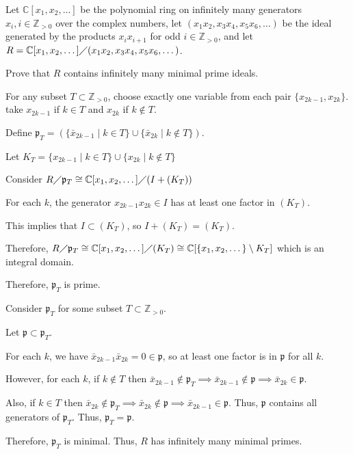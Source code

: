 \documentclass[12pt, letterpaper]{article}
\newcommand{\C}{\mathbb{C}}
\newcommand{\Z}{\mathbb{Z}}
\newcommand{\p}{\mathfrak{p}}
\begin{document}
\begin{problem}{}
    Let $\C[x_1, x_2, \dots]$ be the polynomial ring on infinitely many generators $x_i, i \in \Z_{>0}$ over the
complex numbers, let $(x_1x_2, x_3x_4, x_5x_6, \dots)$ be the ideal generated by the products $x_ix_{i+1}$
for odd $i \in \Z_{>0}$, and let $R =\C[x_1, x_2, \dots]\diagup(x_1x_2, x_3x_4, x_5x_6, \dots)$.
\end{problem}
\begin{subproblem}{}
    Prove that $R$ contains infinitely many minimal prime ideals.
\end{subproblem}
\begin{problemproof}
    For any subset $T \subset \Z_{>0}$, choose exactly one variable from each pair $\{x_{2k-1},x_{2k}\}$.
    take $x_{2k-1}$ if $k \in T$ and $x_{2k}$ if $k \notin T$.

    Define $\p_T = (\{\bar{x}_{2k-1} \mid k \in T\} \cup \{\bar{x}_{2k} \mid k \notin T\})$.

    Let $K_T = \{x_{2k-1} \mid k \in T\} \cup \{x_{2k} \mid k \notin T\}$

    Consider $R \diagup \p_T \cong \C[x_1, x_2, \dots] \diagup (I+(K_T))$

    For each $k$, the generator $x_{2k-1}x_{2k} \in I$ has at least one factor in $(K_T)$.

    This implies that $I \subset (K_T)$, so $I + (K_T) = (K_T)$.

    Therefore, $R \diagup \p_T \cong \C[x_1,x_2,\dots] \diagup (K_T) \cong \C[\{x_1,x_2,\dots\} \setminus K_T]$ which is an integral domain.

    Therefore, $\p_T$ is prime.

    Consider $\p_T$ for some subset $T \subset \Z_{>0}$.

    Let $\p \subset \p_T$.

    For each $k$, we have $\bar{x}_{2k-1}\bar{x}_{2k} =0 \in \p$, so at least one factor is in $\p$ for all $k$.

    However, for each $k$, if $k \notin T$ then $\bar{x}_{2k-1} \notin \p_T \implies \bar{x}_{2k-1} \notin \p \implies \bar{x}_{2k} \in \p$.

    Also, if $k \in T$ then $\bar{x}_{2k} \notin \p_T \implies \bar{x}_{2k} \notin \p \implies \bar{x}_{2k-1} \in \p$. Thus, $\p$ contains all generators of $\p_T$. Thus, $\p_T=\p$.

    Therefore, $\p_T$ is minimal. Thus, $R$ has infinitely many minimal primes.
\end{problemproof}
\end{document}
